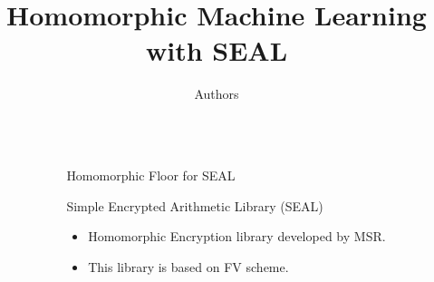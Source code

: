 \documentclass[final]{beamer}
\title{Homomorphic Machine Learning with \textsf{SEAL}} %
\author{Authors} %
\institute{Microsoft Research} %
\newlength{\sepwid}
\newlength{\onecolwid}
\begin{document}

\setlength{\belowcaptionskip}{2ex} %
\setlength\belowdisplayshortskip{2ex} %

\begin{frame}[t] %

\begin{columns}[t] %

\begin{column}{\sepwid}\end{column} %

\begin{column}{\onecolwid} %




\begin{block}{Homomorphic Floor for SEAL}
\end{block}

\begin{alertblock}{Simple Encrypted Arithmetic Library (SEAL)}
	\begin{itemize}
		\item Homomorphic Encryption library developed by MSR.
		\item This library is based on FV scheme.
	\end{itemize}
\end{alertblock}


\end{column} %


\end{columns}
\end{frame}
\end{document}
